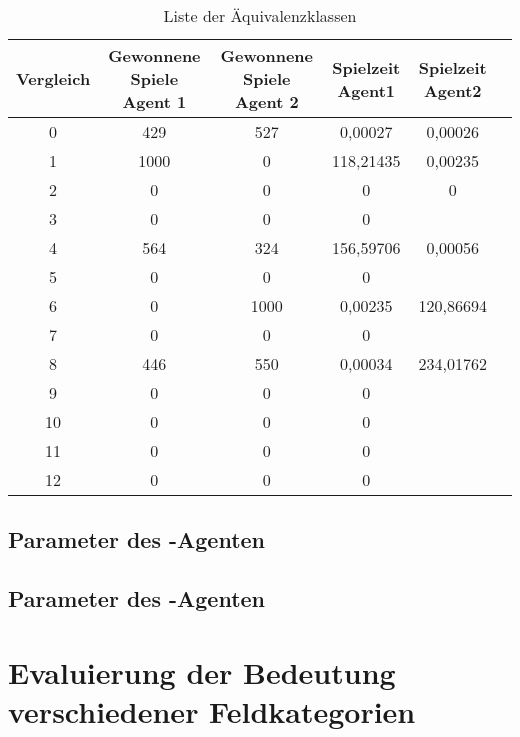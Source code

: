 \begin{table}[ht]
\begin{center}
\begin{tabular}{| c | c | c | c | c | c |} \hline
Vergleich & Gewonnene Spiele Agent 1 & Gewonnene Spiele Agent 2 & Spielzeit Agent1 & Spielzeit Agent2 \\ \hline
\hline
0 & 429 & 527 & 0,00027 & 0,00026  \\ \hline
1 & 1000 & 0 & 118,21435 & 0,00235 \\ \hline
2 & 0 & 0 & 0 & 0  \\ \hline
3 & 0 & 0 & 0  \\ \hline
4 & 564 & 324 & 156,59706 & 0,00056  \\ \hline
5 & 0 & 0 & 0  \\ \hline
6 & 0 & 1000 & 0,00235  & 120,86694  \\ \hline
7 & 0 & 0 & 0  \\ \hline
8 & 446 & 550 & 0,00034 &  234,01762 \\ \hline
9 & 0 & 0 & 0  \\ \hline
10 & 0 & 0 & 0  \\ \hline
11 & 0 & 0 & 0  \\ \hline
12 & 0 & 0 & 0  \\ \hline
\end{tabular}
\end{center}
\caption{Liste der Äquivalenzklassen}
\label{tbl:cmp-results}
\end{table}

\subsection*{Parameter des -Agenten}
\label{eval:agents:params:subsec-mc}

\subsection*{Parameter des -Agenten}
\label{eval:agents:params:subsec-ab}


\section{Evaluierung der Bedeutung verschiedener Feldkategorien}

